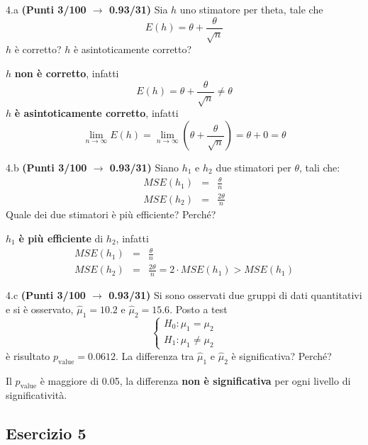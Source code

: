 \documentclass[
  11pt,
]{book}
\theoremstyle{mytheoremstyle}
\theoremstyle{mydefstyle}
\newenvironment{sol}
  {
  \begin{tcolorbox}[enhanced,breakable,arc=0.1mm,boxrule=1pt,colback=white,colframe=iblue,
  title=\bf \fontfamily{lmss}\selectfont \hspace{.5 cm} Soluzione,drop fuzzy shadow]

}{
\end{tcolorbox}
  }
\begin{document}
4.a \textbf{(Punti 3/100 \(\rightarrow\) 0.93/31)} Sia \(h\) uno stimatore per theta, tale che
\[
E(h)=\theta+\frac\theta {\sqrt{ n}}
\]
\(h\) è corretto? \(h\) è asintoticamente corretto?

\begin{sol}
\(h\) \textbf{non è corretto}, infatti
\[
E(h)=\theta+\frac\theta {\sqrt{ n}}\neq\theta
\]
\(h\) \textbf{è asintoticamente corretto}, infatti
\[
\lim_{n\to\infty}E(h)=\lim_{n\to\infty}\left(\theta+\frac\theta {\sqrt{ n}}\right)=\theta+0=\theta
\]

\end{sol}

4.b \textbf{(Punti 3/100 \(\rightarrow\) 0.93/31)} Siano \(h_1\) e \(h_2\) due stimatori per \(\theta\), tali che:
\begin{eqnarray*}
MSE(h_1) &=&   \frac\theta n\\
MSE(h_2) &=&   \frac{2\theta} n
\end{eqnarray*}
Quale dei due stimatori è più efficiente? Perché?

\begin{sol}
\(h_1\) \textbf{è più efficiente} di \(h_2\), infatti
\begin{eqnarray*}
MSE(h_1) &=&   \frac\theta n\\
MSE(h_2) &=&   \frac{2\theta} n =2\cdot MSE(h_1)>MSE(h_1)
\end{eqnarray*}

\end{sol}

4.c \textbf{(Punti 3/100 \(\rightarrow\) 0.93/31)} Si sono osservati due gruppi di dati quantitativi e si è osservato, \(\hat\mu_1=10.2\) e \(\hat\mu_2=15.6\). Posto a test
\[
\begin{cases}
H_0:\mu_1=\mu_2\\
H_1:\mu_1\ne \mu_2
\end{cases}
\]
è risultato \(p_\text{value}=0.0612\). La differenza tra \(\hat\mu_1\) e \(\hat\mu_2\) è significativa? Perché?

\begin{sol}
Il \(p_\text{value}\) è maggiore di 0.05, la differenza \textbf{non è significativa} per ogni livello di significatività.

\end{sol}

\subsection{Esercizio 5}\label{esercizio-5-1}
\end{document}
